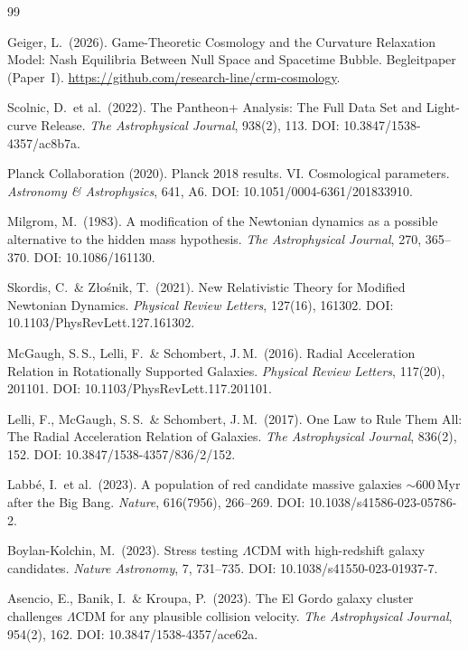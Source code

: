 \documentclass[aps,prd,twocolumn,superscriptaddress,nofootinbib]{revtex4-2}
\begin{document}
\begin{thebibliography}{99}

Geiger, L.\ (2026).
Game-Theoretic Cosmology and the Curvature Relaxation Model: Nash Equilibria Between Null Space and Spacetime Bubble.
Begleitpaper (Paper~I). \url{https://github.com/research-line/crm-cosmology}.

Scolnic, D.\ et al.\ (2022).
The Pantheon+ Analysis: The Full Data Set and Light-curve Release.
\textit{The Astrophysical Journal}, 938(2), 113.
DOI: 10.3847/1538-4357/ac8b7a.

Planck Collaboration (2020).
Planck 2018 results. VI. Cosmological parameters.
\textit{Astronomy \& Astrophysics}, 641, A6.
DOI: 10.1051/0004-6361/201833910.

Milgrom, M.\ (1983).
A modification of the Newtonian dynamics as a possible alternative to the hidden mass hypothesis.
\textit{The Astrophysical Journal}, 270, 365--370.
DOI: 10.1086/161130.

Skordis, C.\ \& Z{\l}o\'snik, T.\ (2021).
New Relativistic Theory for Modified Newtonian Dynamics.
\textit{Physical Review Letters}, 127(16), 161302.
DOI: 10.1103/PhysRevLett.127.161302.

McGaugh, S.\,S., Lelli, F.\ \& Schombert, J.\,M.\ (2016).
Radial Acceleration Relation in Rotationally Supported Galaxies.
\textit{Physical Review Letters}, 117(20), 201101.
DOI: 10.1103/PhysRevLett.117.201101.

Lelli, F., McGaugh, S.\,S.\ \& Schombert, J.\,M.\ (2017).
One Law to Rule Them All: The Radial Acceleration Relation of Galaxies.
\textit{The Astrophysical Journal}, 836(2), 152.
DOI: 10.3847/1538-4357/836/2/152.

Labb\'e, I.\ et al.\ (2023).
A population of red candidate massive galaxies $\sim$600\,Myr after the Big Bang.
\textit{Nature}, 616(7956), 266--269.
DOI: 10.1038/s41586-023-05786-2.

Boylan-Kolchin, M.\ (2023).
Stress testing $\Lambda$CDM with high-redshift galaxy candidates.
\textit{Nature Astronomy}, 7, 731--735.
DOI: 10.1038/s41550-023-01937-7.

Asencio, E., Banik, I.\ \& Kroupa, P.\ (2023).
The El Gordo galaxy cluster challenges $\Lambda$CDM for any plausible collision velocity.
\textit{The Astrophysical Journal}, 954(2), 162.
DOI: 10.3847/1538-4357/ace62a.


\end{thebibliography}
\end{document}
